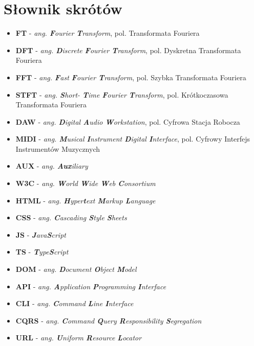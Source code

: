 \documentclass[12pt,a4paper,twoside]{mwart}
\begin{document}
\section{Słownik skrótów}
\begin{itemize}
  \item \textbf{FT} - \textit{ang. \textbf{F}ourier \textbf{T}ransform}, pol. Transformata Fouriera
  \item \textbf{DFT} - \textit{ang. \textbf{D}iscrete \textbf{F}ourier \textbf{T}ransform}, pol. Dyskretna Transformata Fouriera
  \item \textbf{FFT} - \textit{ang. \textbf{F}ast \textbf{F}ourier \textbf{T}ransform}, pol. Szybka Transformata Fouriera
  \item \textbf{STFT} - \textit{ang. \textbf{S}hort- \textbf{T}ime \textbf{F}ourier \textbf{T}ransform}, pol. Krótkoczasowa Transformata Fouriera
  \item \textbf{DAW} - \textit{ang. \textbf{D}igital \textbf{A}udio \textbf{W}orkstation}, pol. Cyfrowa Stacja Robocza 
  \item \textbf{MIDI} - \textit{ang. \textbf{M}usical \textbf{I}nstrument \textbf{D}igital \textbf{I}nterface}, pol. Cyfrowy Interfejs Instrumentów Muzycznych
  \item \textbf{AUX} - \textit{ang. \textbf{Aux}iliary}
  \item \textbf{W3C} - \textit{ang. \textbf{W}orld \textbf{W}ide \textbf{W}eb \textbf{C}onsortium}
  \item \textbf{HTML} - \textit{ang. \textbf{H}yper\textbf{t}ext \textbf{M}arkup \textbf{L}anguage}
  \item \textbf{CSS} - \textit{ang.  \textbf{C}ascading \textbf{S}tyle \textbf{S}heets}
  \item \textbf{JS} - \textit{\textbf{J}ava\textbf{S}cript}
  \item \textbf{TS} - \textit{\textbf{T}ype\textbf{S}cript}
  \item \textbf{DOM} - \textit{ang. \textbf{D}ocument \textbf{O}bject \textbf{M}odel}
  \item \textbf{API} - \textit{ang. \textbf{A}pplication \textbf{P}rogramming \textbf{I}nterface}
  \item \textbf{CLI} - \textit{ang. \textbf{C}ommand \textbf{L}ine \textbf{I}nterface}
  \item \textbf{CQRS} - \textit{ang. \textbf{C}ommand \textbf{Q}uery \textbf{R}esponsibility \textbf{S}egregation}
  \item \textbf{URL} - \textit{ang. \textbf{U}niform \textbf{R}esource \textbf{L}ocator }

\end{itemize}
\end{document}
